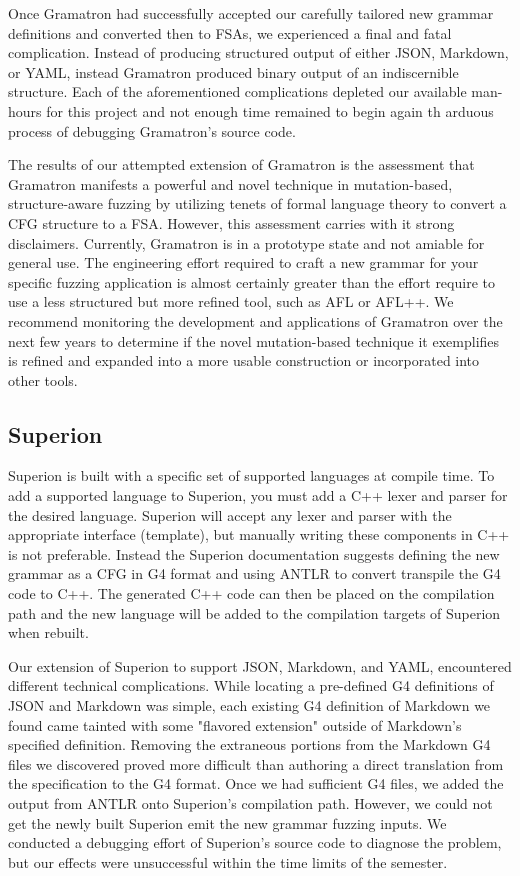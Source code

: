 \documentclass[12pt]{diazessay}
\begin{document}
Once Gramatron had successfully accepted our carefully tailored new grammar definitions and converted then to FSAs, we experienced a final and fatal complication.
Instead of producing structured output of either JSON, Markdown, or YAML, instead Gramatron produced binary output of an indiscernible structure.
Each of the aforementioned complications depleted our available man-hours for this project and not enough time remained to begin again th arduous process of debugging Gramatron's source code.

The results of our attempted extension of Gramatron is the assessment that Gramatron manifests a powerful and novel technique in mutation-based, structure-aware fuzzing by utilizing tenets of formal language theory to convert a CFG structure to a FSA.
However, this assessment carries with it strong disclaimers.
Currently, Gramatron is in a prototype state and not amiable for general use. 
The engineering effort required to craft a new grammar for your specific fuzzing application is almost certainly greater than the effort require to use a less structured but more refined tool, such as AFL or AFL++.
We recommend monitoring the development and applications of Gramatron over the next few years to determine if the novel mutation-based technique it exemplifies is refined and expanded into a more usable construction or incorporated into other tools.

\subsection*{Superion}

Superion is built with a specific set of supported languages at compile time.
To add a supported language to Superion, you must add a C++ lexer and parser for the desired language.
Superion will accept any lexer and parser with the appropriate interface (template), but manually writing these components in C++ is not preferable.
Instead the Superion documentation suggests defining the new grammar as a CFG in G4 format and using ANTLR\cite{parr2013definitive} to convert transpile the G4 code to C++.
The generated C++ code can then be placed on the compilation path and the new language will be added to the compilation targets of Superion when rebuilt.

Our extension of Superion to support JSON, Markdown, and YAML, encountered different technical complications.
While locating a pre-defined G4 definitions of JSON and Markdown was simple, each existing G4 definition of Markdown we found came tainted with some "flavored extension" outside of Markdown's specified definition.
Removing the extraneous portions from the Markdown G4 files we discovered proved more difficult than authoring a direct translation from the specification to the G4 format.
Once we had sufficient G4 files, we added the output from ANTLR onto Superion's compilation path.
However, we could not get the newly built Superion emit the new grammar fuzzing inputs.
We conducted a debugging effort of Superion's source code to diagnose the problem, but our effects were unsuccessful within the time limits of the semester.
\end{document}
